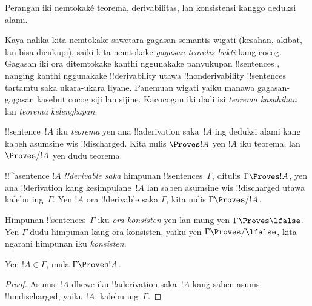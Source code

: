 \documentclass[../../../include/open-logic-section]{subfiles}
\begin{document}
      {}
      {}


Perangan iki nemtokaké teorema, derivabilitas, lan konsistensi
kanggo deduksi alami.

\begin{explain}
Kaya nalika kita nemtokake sawetara gagasan semantis wigati
(kesahan, akibat, lan bisa dicukupi), saiki kita nemtokake
\emph{gagasan teoretis-bukti} kang cocog. Gagasan iki ora ditemtokake
kanthi nggunakake panyukupan !!{sentence}s , nanging
kanthi nggunakake !!{derivability} utawa !!{nonderivability}
!!{sentence}s tartamtu saka ukara-ukara liyane. Panemuan wigati yaiku
manawa gagasan-gagasan kasebut cocog siji lan sijine. Kacocogan iki
dadi isi \emph{teorema kasahihan} lan \emph{teorema kelengkapan}.
\end{explain}


\begin{defn}[Teorema]
!!{sentence}~$!A$ iku \emph{teorema} yen ana !!a{derivation}
saka~$!A$ ing deduksi alami kang kabeh asumsine wis
!!{discharged}. Kita nulis $\Proves !A$ yen $!A$ iku teorema, lan
$\Proves/ !A$ yen dudu teorema.
\end{defn}

\begin{defn}[!!^{derivability}]
!!^a{sentence} $!A$ \emph{!!{derivable} saka} himpunan
!!{sentence}s~$\Gamma$, ditulis $\Gamma \Proves !A$, yen ana
!!{derivation} kang kesimpulane~$!A$ lan saben asumsine wis
!!{discharged} utawa kalebu ing~$\Gamma$. Yen $!A$ ora !!{derivable} saka $\Gamma$, kita nulis $\Gamma \Proves/ !A$.
\end{defn}

\begin{defn}[Konsistensi]
Himpunan !!{sentence}s~$\Gamma$ iku \emph{ora konsisten} yen lan mung
yen $\Gamma \Proves \lfalse$. Yen $\Gamma$ dudu himpunan kang ora
konsisten, yaiku yen $\Gamma \Proves/ \lfalse$, kita ngarani himpunan
iku \emph{konsisten}.
\end{defn}

\begin{prop}[Refleksivitas]
Yen $!A \in \Gamma$, mula $\Gamma \Proves !A$.
\end{prop}

\begin{proof}
Asumsi $!A$ dhewe iku !!a{derivation} saka~$!A$ kang saben asumsi
!!{undischarged}, yaiku $!A$, kalebu ing~$\Gamma$.
\end{proof}
\end{document}
